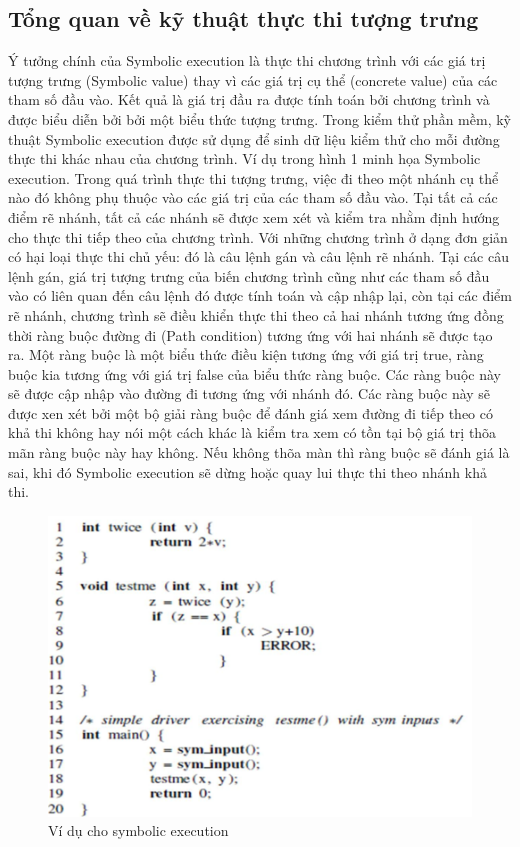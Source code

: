 \documentclass[12pt,a4paper]{article}
\begin{document}
\subsection{Tổng quan về kỹ thuật thực thi tượng trưng}
Ý tưởng chính của Symbolic execution là thực thi chương trình với các giá trị tượng trưng (Symbolic value) thay vì các giá trị cụ thể (concrete value) của các tham số đầu vào. Kết quả là giá trị đầu ra được tính toán bởi chương trình và được biểu diễn bởi bởi một biểu thức tượng trưng. Trong kiểm thử phần mềm, kỹ thuật Symbolic execution được sử dụng để sinh dữ liệu kiểm thử cho mỗi đường thực thi khác nhau của chương trình. Ví dụ trong hình 1 minh họa Symbolic execution.\newline
\indent Trong quá trình thực thi tượng trưng, việc đi theo một nhánh cụ thể nào đó không phụ thuộc vào các giá trị của các tham số đầu vào. Tại tất cả các điểm rẽ nhánh, tất cả các nhánh sẽ được xem xét và kiểm tra nhằm định hướng cho thực thi tiếp theo của chương trình. Với những chương trình ở dạng đơn giản có hại loại thực thi chủ yếu: đó là câu lệnh gán và câu lệnh rẽ nhánh. Tại các câu lệnh gán, giá trị tượng trưng của biến chương trình cũng như các tham số đầu vào có liên quan đến câu lệnh đó được tính toán và cập nhập lại, còn tại các điểm rẽ nhánh, chương trình sẽ điều khiển thực thi theo cả hai nhánh tương ứng đồng thời ràng buộc đường đi (Path condition) tương ứng với hai nhánh sẽ được tạo ra. Một ràng buộc là một biểu thức điều kiện tương ứng với giá trị true, ràng buộc kia tương ứng với giá trị false của biểu thức ràng buộc. Các ràng buộc này sẽ được cập nhập vào đường đi tương ứng với nhánh đó. Các ràng buộc này sẽ được xen xét bởi một bộ giải ràng buộc để đánh giá xem đường đi tiếp theo có khả thi không hay nói một cách khác là kiểm tra xem có tồn tại bộ giá trị thõa mãn ràng buộc này hay không. Nếu không thõa màn thì ràng buộc sẽ đánh giá là sai, khi đó Symbolic execution sẽ dừng hoặc quay lui thực thi theo nhánh khả thi.\newline
\begin{figure}[ht]
\begin{center}
\includegraphics{hinhanh/hinh1}
\end{center}
\caption{Ví dụ cho symbolic execution}
\end{figure}
\end{document}
